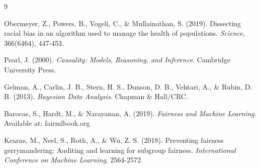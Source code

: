 \documentclass[11pt,a4paper]{article}
\theoremstyle{plain}
\theoremstyle{definition}
\theoremstyle{remark}
\begin{document}

\begin{thebibliography}{9}

Obermeyer, Z., Powers, B., Vogeli, C., \& Mullainathan, S. (2019).
Dissecting racial bias in an algorithm used to manage the health of populations.
\textit{Science}, 366(6464), 447-453.

Pearl, J. (2000).
\textit{Causality: Models, Reasoning, and Inference}.
Cambridge University Press.

Gelman, A., Carlin, J. B., Stern, H. S., Dunson, D. B., Vehtari, A., \& Rubin, D. B. (2013).
\textit{Bayesian Data Analysis}.
Chapman \& Hall/CRC.

Barocas, S., Hardt, M., \& Narayanan, A. (2019).
\textit{Fairness and Machine Learning}.
Available at: fairmlbook.org

Kearns, M., Neel, S., Roth, A., \& Wu, Z. S. (2018).
Preventing fairness gerrymandering: Auditing and learning for subgroup fairness.
\textit{International Conference on Machine Learning}, 2564-2572.

\end{thebibliography}
\end{document}
